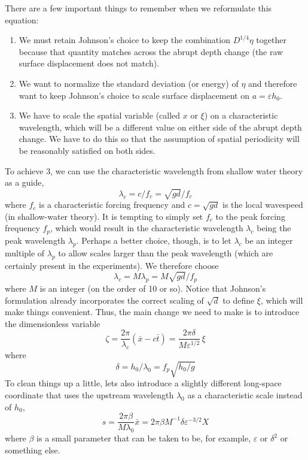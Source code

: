 \documentclass[12pt]{article}
\newcommand{\eps}{\varepsilon}
\begin{document}
There are a few important things to remember when we reformulate this equation:
\begin{enumerate}
\item We must retain Johnson's choice to keep the combination $D^{1/4} \eta$ together because that quantity matches across the abrupt depth change (the raw surface displacement does not match).
\item We want to normalize the standard deviation (or energy) of $\eta$ and therefore want to keep Johnson's choice to scale surface displacement on $a = \eps h_0$.
\item We have to scale the spatial variable (called $x$ or $\xi$) on a characteristic wavelength, which will be a different value on either side of the abrupt depth change. We have to do this so that the assumption of spatial periodicity will be reasonably satisfied on both sides.
\end{enumerate}
To achieve 3, we can use the characteristic wavelength from shallow water theory as a guide,
\begin{equation}
\lambda_c = {c}/{f_c} = \sqrt{g d}/f_c
\end{equation}
where $f_c$ is a characteristic forcing frequency and $c = \sqrt{g d}$ is the local wavespeed (in shallow-water theory). It is tempting to simply set $f_c$ to the peak forcing frequency $f_p$, which would result in the characteristic wavelength $\lambda_c$ being the peak wavelength $\lambda_p$. Perhaps a better choice, though, is to let $\lambda_c$ be an integer multiple of $\lambda_p$ to allow scales larger than the peak wavelength (which are certainly present in the experiments). We therefore choose
\begin{equation}
\lambda_c = M \lambda_p = M \sqrt{gd} / f_p
\end{equation}
where $M$ is an integer (on the order of 10 or so). Notice that Johnson's formulation already incorporates the correct scaling of $\sqrt{d}$ to define $\xi$, which will make things convenient. Thus, the main change we need to make is to introduce the dimensionless variable
\begin{equation}
\zeta = \frac{2\pi}{\lambda_c} (\bar{x} - c \bar{t}) 
= \frac{2 \pi \delta}{M \eps^{1/2}} \, \xi
\end{equation}
where
\begin{equation}
\delta = h_0 / \lambda_0 = f_p \sqrt{h_0/g}
\end{equation}
To clean things up a little, lets also introduce a slightly different long-space coordinate that uses the upstream wavelength $\lambda_0$ as a characteristic scale instead of $h_0$,
\begin{equation}
s = \frac{2 \pi \beta}{M \lambda_0} \bar{x} = 2 \pi \beta M^{-1} \delta \eps^{-3/2} X
\end{equation}
where $\beta$ is a small parameter that can be taken to be, for example, $\eps$ or $\delta^2$ or something else.
\end{document}
